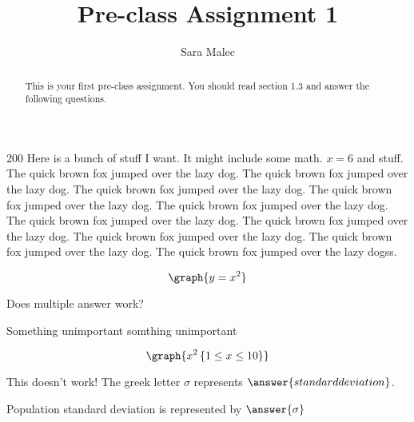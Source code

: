 \documentclass[handout, space]{ximera}
\title{Pre-class Assignment 1}
\author{Sara Malec}
\begin{document}
\begin{abstract}
  This is your first pre-class assignment. You should read section 1.3 and answer the following questions.
\end{abstract}
\maketitle

\begin{leash}{200}
Here is a bunch of stuff I want. It might include some math. $x=6$ and stuff.
The quick brown fox jumped over the lazy dog.
The quick brown fox jumped over the lazy dog.
The quick brown fox jumped over the lazy dog.
The quick brown fox jumped over the lazy dog.
The quick brown fox jumped over the lazy dog.
The quick brown fox jumped over the lazy dog.
The quick brown fox jumped over the lazy dog.
The quick brown fox jumped over the lazy dog.
The quick brown fox jumped over the lazy dog.
The quick brown fox jumped over the lazy dogss.
\end{leash}


\begin{problem}

\[\graph{y=x^2}\]

\end{problem}

\begin{problem} Does multiple answer work?
\begin{selectAll}
\end{selectAll}
\end{problem}

\begin{problem}
\begin{foldable}
 Something unimportant  somthing
unimportant 
\end{foldable}
   \[ 
   \graph{x^2 \left\{ 1 \leq x \leq 10 \right\} }
   \]
\end{problem}

\begin{problem}


    This doesn't work!  The greek letter $\sigma$ represents $\answer{standard deviation}$.
\end{problem}

\begin{problem}
    Population standard deviation is represented by $\answer{\sigma}$
\end{problem}
\end{document}
